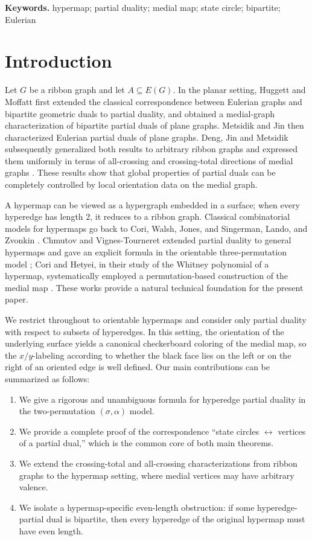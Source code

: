 \documentclass{article}
\begin{document}
\noindent\textbf{Keywords.} hypermap; partial duality; medial map; state circle; bipartite; Eulerian


\section{Introduction}

Let $G$ be a ribbon graph and let $A\subseteq E(G)$. In the planar setting, Huggett and Moffatt first extended the classical correspondence between Eulerian graphs and bipartite geometric duals to partial duality, and obtained a medial-graph characterization of bipartite partial duals of plane graphs. Metsidik and Jin then characterized Eulerian partial duals of plane graphs. Deng, Jin and Metsidik subsequently generalized both results to arbitrary ribbon graphs and expressed them uniformly in terms of all-crossing and crossing-total directions of medial graphs \cite{HuggettMoffatt2013,MetsidikJin2018,DengJinMetsidik2020}. These results show that global properties of partial duals can be completely controlled by local orientation data on the medial graph.

A hypermap can be viewed as a hypergraph embedded in a surface; when every hyperedge has length $2$, it reduces to a ribbon graph. Classical combinatorial models for hypermaps go back to Cori, Walsh, Jones, and Singerman, Lando, and Zvonkin \cite{Cori1975,Walsh1975,JonesSingerman1978,LandoZvonkin2004}. Chmutov and Vignes-Tourneret extended partial duality to general hypermaps and gave an explicit formula in the orientable three-permutation model \cite{ChmutovVignes2022}; Cori and Hetyei, in their study of the Whitney polynomial of a hypermap, systematically employed a permutation-based construction of the medial map \cite{CoriHetyei2025}. These works provide a natural technical foundation for the present paper.

We restrict throughout to orientable hypermaps and consider only partial duality with respect to subsets of hyperedges. In this setting, the orientation of the underlying surface yields a canonical checkerboard coloring of the medial map, so the $x/y$-labeling according to whether the black face lies on the left or on the right of an oriented edge is well defined. Our main contributions can be summarized as follows:
\begin{enumerate}
  \item We give a rigorous and unambiguous formula for hyperedge partial duality in the two-permutation $(\sigma,\alpha)$ model.
  \item We provide a complete proof of the correspondence ``state circles $\leftrightarrow$ vertices of a partial dual,'' which is the common core of both main theorems.
  \item We extend the crossing-total and all-crossing characterizations from ribbon graphs to the hypermap setting, where medial vertices may have arbitrary valence.
  \item We isolate a hypermap-specific even-length obstruction: if some hyperedge-partial dual is bipartite, then every hyperedge of the original hypermap must have even length.
\end{enumerate}
\end{document}
